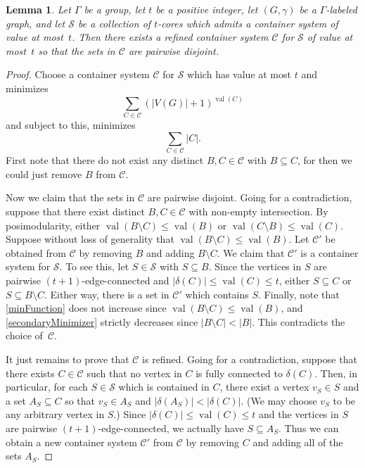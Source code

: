 \documentclass[11pt]{article}
\newtheorem{lemma}[thm]{Lemma}
\theoremstyle{definition}
\DeclareMathOperator{\val}{val}
\begin{document}
\begin{lemma}
\label{lem:LaminarCertificates}
    Let $\Gamma$ be a group, let $t$ be a positive integer, let $(G, \gamma)$ be a $\Gamma$-labeled graph, and let $\mathcal{S}$ be a collection of $t$-cores which admits a container system of value at most~$t$. Then there exists a refined container system $\mathcal{C}$ for $\mathcal{S}$ of value at most~$t$ so that the sets in $\mathcal{C}$ are pairwise disjoint.
\end{lemma}
\begin{proof}
    Choose a container system $\mathcal{C}$ for $\mathcal{S}$ which has value at most $t$ and minimizes
    \begin{equation}\label{minFunction}
        \sum_{C \in \mathcal{C}} (|V(G)| + 1)^{\val(C)}\tag{$*$}
    \end{equation}
    and subject to this, minimizes
    \begin{equation}\label{secondaryMinimizer}
        \sum_{C \in \mathcal{C}} |C|. \tag{$**$}
    \end{equation} First note that there do not exist any distinct $B, C \in \mathcal{C}$ with $B \subseteq C$, for then we could just remove $B$ from $\mathcal{C}$.
    
    Now we claim that the sets in $\mathcal{C}$ are pairwise disjoint. Going for a contradiction, suppose that there exist distinct $B,C \in \mathcal{C}$ with non-empty intersection. By posimodularity, either $\val(B \setminus C) \leq \val(B)$ or $\val(C \setminus B) \leq \val(C)$. Suppose without loss of generality that $\val(B \setminus C) \leq \val(B)$. Let $\mathcal{C'}$ be obtained from $\mathcal{C}$ by removing $B$ and adding $B \setminus C$. We claim that $\mathcal{C}'$ is a container system for $\mathcal{S}$. To see this, let $S \in \mathcal{S}$ with $S \subseteq B$. Since the vertices in $S$ are pairwise $(t+1)$-edge-connected and $|\delta(C)|\leq \val(C)\leq t$, either $S \subseteq C$ or $S \subseteq B \setminus C$. Either way, there is a set in $\mathcal{C}'$ which contains $S$. Finally, note that \eqref{minFunction} does not increase since $\val(B \setminus C) \leq \val(B)$, and \eqref{secondaryMinimizer} strictly decreases since $|B\setminus C|<|B|$. This contradicts the choice of~$\mathcal{C}$.

    It just remains to prove that $\mathcal{C}$ is refined. Going for a contradiction, suppose that there exists $C \in \mathcal{C}$ such that no vertex in $C$ is fully connected to $\delta(C)$. Then, in particular, for each $S \in \mathcal{S}$ which is contained in $C$, there exist a vertex $v_S \in S$ and a set $A_S \subseteq C$ so that $v_S \in A_S$ and $|\delta(A_S)|<|\delta(C)|$. (We may choose $v_S$ to be any arbitrary vertex in $S$.) Since $|\delta(C)| \leq \val(C)\leq t$ and the vertices in $S$ are pairwise $(t+1)$-edge-connected, we actually have $S \subseteq A_S$. Thus we can obtain a new container system $\mathcal{C}'$ from $\mathcal{C}$ by removing $C$ and adding all of the sets $A_S$. 
    

\end{proof}
\end{document}
